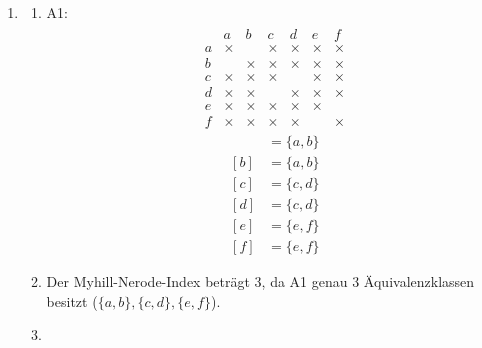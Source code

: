 \begin{enumerate}[1.]
  \item\label{kfs_serie_10_aufgabe_1}
    \begin{enumerate}
      \item A1:
        \begin{align*}
          \begin{matrix}
              & a      & b      & c      & d      & e      & f\\
            a & \times &        & \times & \times & \times & \times\\
            b &        & \times & \times & \times & \times & \times\\
            c & \times & \times & \times &        & \times & \times\\
            d & \times & \times &        & \times & \times & \times\\
            e & \times & \times & \times & \times & \times & \\
            f & \times & \times & \times & \times &        & \times
          \end{matrix}
        \end{align*}
        \begin{align*}
          [a] & = \{ a, b \}\\
          [b] & = \{ a, b \}\\
          [c] & = \{ c, d \}\\
          [d] & = \{ c, d \}\\
          [e] & = \{ e, f \}\\
          [f] & = \{ e, f \}
        \end{align*}

      \item Der Myhill-Nerode-Index beträgt $3$, da A1 genau $3$
        Äquivalenzklassen besitzt ($\{a,b\}, \{c,d\}, \{e,f\}$).

      \item \
        \begin{center}
        \end{center}


\end{enumerate}
\end{enumerate}

